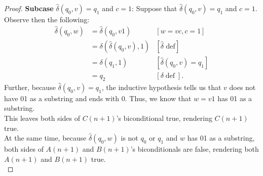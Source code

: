 \documentclass[10pt]{article}
\begin{document}
\begin{enumerate}[label={}]
\begin{proof}
                  \textbf{Subcase }$\hat{\delta}\left(q_0, v\right)=q_1$ and $c=1$: Suppose that $\hat{\delta}\left(q_0, v\right)=q_1$ and $c=1$. Observe then the following:
                  $$
                        \begin{aligned}
                              \hat{\delta}\left(q_0, w\right) & =\hat{\delta}\left(q_0, v 1\right)                     & {[w=v c, c=1] }                                     \\
                                                              & =\delta\left(\hat{\delta}\left(q_0, v\right), 1\right) & {[\hat{\delta} \text { def}] }                      \\
                                                              & =\delta\left(q_1, 1\right)                             & {\left[\hat{\delta}\left(q_0, v\right)=q_1\right] } \\
                                                              & =q_2                                                   & {[\delta \operatorname{def}] . }
                        \end{aligned}
                  $$
                  Further, because $\hat{\delta}\left(q_0, v\right)=q_1$, the inductive hypothesis tells us that $v$ does not have 01 as a substring and ends with 0. Thus, we know that $w=v1$ has 01 as a substring.\\
                  This leaves both sides of $C(n+1)$'s biconditional true, rendering $C(n+1)$ true.\\
                  At the same time, because $\hat{\delta}\left(q_0, w\right)$ is not $q_0$ or $q_1$ and $w$ has 01 as a substring, both sides of $A(n+1)$ and $B(n+1)$'s biconditionals are false, rendering both $A(n+1)$ and $B(n+1)$ true.\\


\end{proof}
\end{enumerate}
\end{document}
